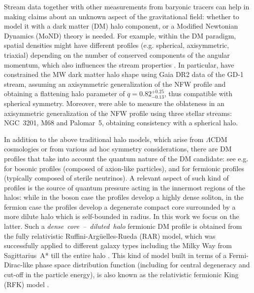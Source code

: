 \documentclass[twocolumn]{aa}
\begin{document}
Stream data together with other measurements from baryonic tracers can help in making claims about an unknown aspect of the gravitational field: whether to model it with a dark matter (DM) halo component, or a Modified Newtonian Dynamics (MoND) theory is needed.
For example, within the DM paradigm, spatial densities might have different profiles
(e.g. spherical, axisymmetric, triaxial) depending on the number of conserved components of the angular momentum, which also influences the stream properties \citep{2013ApJ...773L...4V,2016MNRAS.455.1079P,2020MNRAS.492.4398M}.
In particular, \citet{2019MNRAS.486.2995M} have constrained the MW dark matter halo shape using Gaia DR2 data of the GD-1 stream, assuming an axisymmetric generalization of the NFW profile and obtaining a flattening halo parameter of $q=0.82^{+0.25}_{-0.13}$, thus compatible with spherical symmetry.
Moreover, \cite{2023MNRAS.524.2124P} were able to measure the oblateness in an axisymmetric generalization of the NFW profile using three stellar streams: NGC~3201, M68 and Palomar~5, obtaining
consistency with a spherical halo.

In addition to the above traditional halo models, which arise from $\Lambda$CDM cosmologies or from various ad hoc symmetry considerations, there are DM profiles that take into account the quantum nature of the DM candidate: see e.g. \cite{2014NatPh..10..496S} for bosonic profiles (composed of axion-like particles), and \cite{2015MNRAS.451..622R,2015PhRvD..92l3527C,2021MNRAS.502.4227A} for fermionic profiles (typically composed of sterile neutrinos). A relevant aspect of such kind of profiles is the source of quantum pressure acting in the innermost regions of the halos: while in the boson case the profiles develop a highly dense soliton, in the fermion case the profiles develop a degenerate compact core surrounded by a more dilute halo which is self-bounded in radius. In this work we focus on the latter. Such a \emph{dense~core~--~diluted~halo} fermionic DM profile is obtained from the fully relativistic Ruffini-Argüelles-Rueda (RAR) model, which was successfully applied to different galaxy types \citep{2019PDU....24..278A,2023ApJ...945....1K} including the Milky Way from Sagittarius~A* till the entire halo \citep{arguelles_novel_2018,2020A&A...641A..34B,2021MNRAS.505L..64B,2022MNRAS.511L..35A}.
This kind of model built in terms of a Fermi-Dirac-like phase space distribution function (including for central degeneracy and cut-off in the particle energy), is also known as the relativistic fermionic King (RFK) model \citep{2022PhRvD.106d3538C}.
\end{document}
